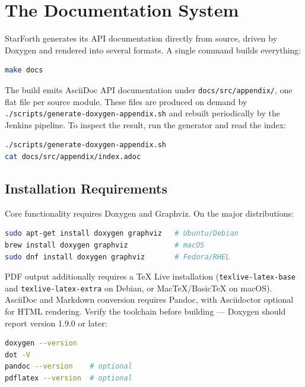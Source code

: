 
\section{The Documentation System}

StarForth generates its API documentation directly from source, driven by
Doxygen and rendered into several formats. A single command builds everything:

\begin{lstlisting}[language=bash]
make docs
\end{lstlisting}

The build emits AsciiDoc API documentation under \texttt{docs/src/appendix/},
one flat file per source module. These files are produced on demand by
\texttt{./scripts/generate-doxygen-appendix.sh} and rebuilt periodically by the
Jenkins pipeline. To inspect the result, run the generator and read the index:

\begin{lstlisting}[language=bash]
./scripts/generate-doxygen-appendix.sh
cat docs/src/appendix/index.adoc
\end{lstlisting}

\subsection{Installation Requirements}

Core functionality requires Doxygen and Graphviz. On the major distributions:

\begin{lstlisting}[language=bash]
sudo apt-get install doxygen graphviz   # Ubuntu/Debian
brew install doxygen graphviz           # macOS
sudo dnf install doxygen graphviz       # Fedora/RHEL
\end{lstlisting}

PDF output additionally requires a TeX Live installation
(\texttt{texlive-latex-base} and \texttt{texlive-latex-extra} on Debian, or
MacTeX/BasicTeX on macOS). AsciiDoc and Markdown conversion requires Pandoc,
with Asciidoctor optional for HTML rendering. Verify the toolchain before
building --- Doxygen should report version 1.9.0 or later:

\begin{lstlisting}[language=bash]
doxygen --version
dot -V
pandoc --version    # optional
pdflatex --version  # optional
\end{lstlisting}

